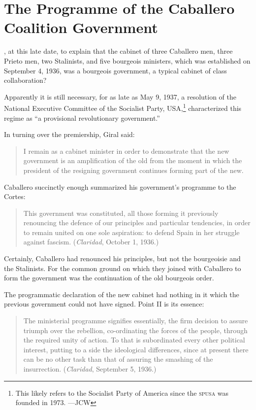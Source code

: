 \chapter{The Programme of the Caballero Coalition Government}

, at this late date, to explain that the cabinet of three Caballero men, three Prieto men, two Stalinists, and five bourgeois ministers, which was established on September 4, 1936, was a bourgeois government, a typical cabinet of class collaboration?

Apparently it is still necessary, for as late as May 9, 1937, a resolution of the National Executive Committee of the Socialist Party, USA,\footnote{This likely refers to the Socialist Party of America since the \textsc{spusa} was founded in 1973. ---JCW} characterized this regime as ``a provisional revolutionary government.''

In turning over the premiership, Giral said:

\begin{quotation}
  I remain as a cabinet minister in order to demonstrate that the new government is an amplification of the old from the moment in which the president of the resigning government continues forming part of the new.
\end{quotation}

Caballero succinctly enough summarized his government’s programme to the Cortes:

\begin{quotation}
  This government was constituted, all those forming it previously renouncing the defence of our principles and particular tendencies, in order to remain united on one sole aspiration: to defend Spain in her struggle against fascism. (\emph{Claridad}, October 1, 1936.)
\end{quotation}

Certainly, Caballero had renounced his principles, but not the bourgeoisie and the Stalinists. For the common ground on which they joined with Caballero to form the government was the continuation of the old bourgeois order.

The programmatic declaration of the new cabinet had nothing in it which the previous government could not have signed. Point II is its essence:

\begin{quotation}
  The ministerial programme signifies essentially, the firm decision to assure triumph over the rebellion, co-ordinating the forces of the people, through the required unity of action. To that is subordinated every other political interest, putting to a side the ideological differences, since at present there can be no other task than that of assuring the smashing of the insurrection. (\emph{Claridad}, September 5, 1936.)
\end{quotation}

